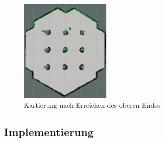 {{\begin{figure}[H]
\begin{minipage}{0.5\textwidth}
				\centering
				\includegraphics[height=5cm]{Bilder/mapping_smpl_4.png}
				\caption{Kartierung nach Erreichen des oberen Endes}
				\label{pic:mapping_smpl_4}	
			\end{minipage}
		\end{figure}
	}
	\subsection{Implementierung}
	{
	}
}